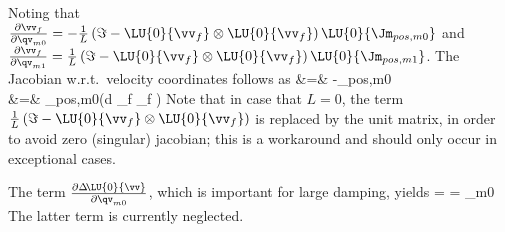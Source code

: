     Noting that $\frac{\partial \vv_{f} }{\partial \qv_{m0}} = 
    -\frac{1}{L}\left(\Im - \LU{0}{\vv_{f}} \otimes \LU{0}{\vv_{f}} \right) \LU{0}{\Jm_{pos,m0}}$ and 
    $\frac{\partial \vv_{f} }{\partial \qv_{m1}} = 
    \frac{1}{L}\left(\Im - \LU{0}{\vv_{f}} \otimes \LU{0}{\vv_{f}} \right) \LU{0}{\Jm_{pos,m1}}$.
    The Jacobian w.r.t.\ velocity coordinates follows as
    \bea
      &=& -\Jm_{pos,m0}\tp {}
      \nonumber \\
      &=& \Jm_{pos,m0}\tp \left(d \vv_{f} \otimes \vv_{f} \right)  
    \eea
    Note that in case that $L=0$, the term $\frac{1}{L} \left(\Im - \LU{0}{\vv_{f}} \otimes \LU{0}{\vv_{f}} \right)$ is replaced
    by the unit matrix, in order to avoid zero (singular) jacobian; this is a workaround and should only occur in exceptional cases.
    
    The term $\frac{\partial \Delta\! \LU{0}{\vv}}{\partial \qv_{m0}}$, which is important for large damping, yields
    \be
       = 
      =
       \dot \qv_{m0}
    \ee
    The latter term is currently neglected.
    
